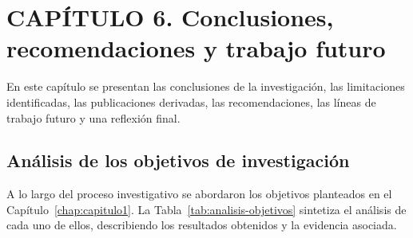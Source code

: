 \chapter*{CAPÍTULO 6. Conclusiones, recomendaciones y trabajo futuro}
\setcounter{chapter}{6}
\setcounter{section}{0}
\setcounter{subsection}{0}
\setcounter{subsubsection}{0}
\setcounter{figure}{0}
\setcounter{table}{0}
\renewcommand{\thesection}{\thechapter.\arabic{section}}
\renewcommand{\thesubsection}{\thesection.\arabic{subsection}}
\renewcommand{\thesubsubsection}{\thesubsection.\arabic{subsubsection}}
\makeatletter
\protected@edef\@currentlabel{\thechapter}%
\makeatother
\label{chap:capitulo6}

\setlength{\parindent}{0pt}

En este capítulo se presentan las conclusiones de la investigación, las limitaciones identificadas, las publicaciones derivadas, las recomendaciones, las líneas de trabajo futuro y una reflexión final.

\section{Análisis de los objetivos de investigación}
\label{sec:analisis-objetivos-investigacion}

A lo largo del proceso investigativo se abordaron los objetivos planteados en el Capítulo~\ref{chap:capitulo1}. La Tabla~\ref{tab:analisis-objetivos} sintetiza el análisis de cada uno de ellos, describiendo los resultados obtenidos y la evidencia asociada.

\begingroup
\scriptsize
\renewcommand{\arraystretch}{1.4}
\setlength{\tabcolsep}{4pt}
\setlength{\LTleft}{0pt}
\setlength{\LTright}{0pt}

